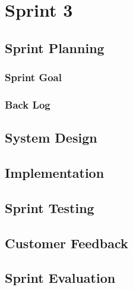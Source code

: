 \chapter{Sprint 3}


\section{Sprint Planning}

\subsection{Sprint Goal}

\subsection{Back Log}


\section{System Design}


\section{Implementation}


\section{Sprint Testing}


\section{Customer Feedback}


\section{Sprint Evaluation}


